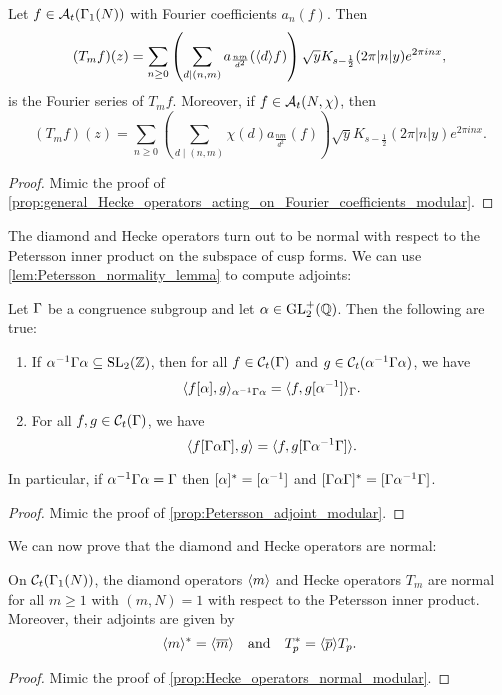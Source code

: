       \begin{proposition}\label{prop:general_Hecke_operators_acting_on_Fourier_coefficients_Maass}
        Let $f \in \mathcal{A}_{t}(\Gamma_{1}(N))$ with Fourier coefficients $a_{n}(f)$. Then
        \[
          (T_{m}f)(z) = \sum_{n \ge 0}\left(\sum_{d \mid (n,m)}a_{\frac{nm}{d^{2}}}(\langle d\rangle f)\right)\sqrt{y}K_{s-\frac{1}{2}}(2\pi|n|y)e^{2\pi inx},
        \]
        is the Fourier series of $T_{m}f$. Moreover, if $f \in \mathcal{A}_{t}(N,\chi)$, then
        \[
          (T_{m}f)(z) = \sum_{n \ge 0}\left(\sum_{d \mid (n,m)}\chi(d)a_{\frac{nm}{d^{2}}}(f)\right)\sqrt{y}K_{s-\frac{1}{2}}(2\pi|n|y)e^{2\pi inx}.
        \]
      \end{proposition}
      \begin{proof}
        Mimic the proof of \cref{prop:general_Hecke_operators_acting_on_Fourier_coefficients_modular}.
      \end{proof}

      The diamond and Hecke operators turn out to be normal with respect to the Petersson inner product on the subspace of cusp forms. We can use \cref{lem:Petersson_normality_lemma} to compute adjoints:

      \begin{proposition}\label{prop:Petersson_adjoint_Maass}
        Let $\Gamma$ be a congruence subgroup and let $\alpha \in \mathrm{GL}_{2}^{+}(\mathbb{Q})$. Then the following are true:
        \begin{enumerate}[label=(\roman*)]
          \item If $\alpha^{-1}\Gamma\alpha \subseteq \mathrm{SL}_{2}(\mathbb{Z})$, then for all $f \in \mathcal{C}_{t}(\Gamma)$ and $g \in \mathcal{C}_{t}(\alpha^{-1}\Gamma\alpha)$, we have
          \[
            \langle f[\alpha],g\rangle_{\alpha^{-1}\Gamma\alpha} = \langle f,g[\alpha^{-1}]\rangle_{\Gamma}.
          \]
          \item For all $f,g \in \mathcal{C}_{t}(\Gamma)$, we have
          \[
            \langle f[\Gamma\alpha\Gamma],g\rangle = \langle f,g[\Gamma\alpha^{-1}\Gamma]\rangle.
          \]
        \end{enumerate}
        In particular, if $\alpha^{-1}\Gamma\alpha = \Gamma$ then $[\alpha]^{\ast} = [\alpha^{-1}]$ and $[\Gamma\alpha\Gamma]^{\ast} = [\Gamma\alpha^{-1}\Gamma]$.   
      \end{proposition}
      \begin{proof}
        Mimic the proof of \cref{prop:Petersson_adjoint_modular}.
      \end{proof}

      We can now prove that the diamond and Hecke operators are normal:

      \begin{proposition}\label{prop:Hecke_operators_normal_Maass}
        On $\mathcal{C}_{t}(\Gamma_{1}(N))$, the diamond operators $\langle m\rangle$ and Hecke operators $T_{m}$ are normal for all $m \ge 1$ with $(m,N) = 1$ with respect to the Petersson inner product. Moreover, their adjoints are given by
        \[
          \langle m\rangle^{\ast} = \langle\overline{m}\rangle \quad \text{and} \quad T_{p}^{\ast} = \langle\overline{p}\rangle T_{p}.
        \]
      \end{proposition}
      \begin{proof}
        Mimic the proof of \cref{prop:Hecke_operators_normal_modular}.
      \end{proof}

